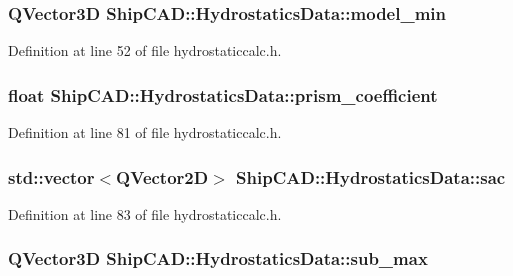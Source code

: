 \subsubsection[{\texorpdfstring{model\+\_\+min}{model_min}}]{\setlength{\rightskip}{0pt plus 5cm}Q\+Vector3D Ship\+C\+A\+D\+::\+Hydrostatics\+Data\+::model\+\_\+min}\hypertarget{structShipCAD_1_1HydrostaticsData_acd93669bc08fa097974d41fbaf4dc81f}{}\label{structShipCAD_1_1HydrostaticsData_acd93669bc08fa097974d41fbaf4dc81f}


Definition at line 52 of file hydrostaticcalc.\+h.

\subsubsection[{\texorpdfstring{prism\+\_\+coefficient}{prism_coefficient}}]{\setlength{\rightskip}{0pt plus 5cm}float Ship\+C\+A\+D\+::\+Hydrostatics\+Data\+::prism\+\_\+coefficient}\hypertarget{structShipCAD_1_1HydrostaticsData_acabee310fcde293fcb0d9a5fd5effe27}{}\label{structShipCAD_1_1HydrostaticsData_acabee310fcde293fcb0d9a5fd5effe27}


Definition at line 81 of file hydrostaticcalc.\+h.

\subsubsection[{\texorpdfstring{sac}{sac}}]{\setlength{\rightskip}{0pt plus 5cm}std\+::vector$<$Q\+Vector2D$>$ Ship\+C\+A\+D\+::\+Hydrostatics\+Data\+::sac}\hypertarget{structShipCAD_1_1HydrostaticsData_a503a1f2299db9d5ae923e598b8ee31ba}{}\label{structShipCAD_1_1HydrostaticsData_a503a1f2299db9d5ae923e598b8ee31ba}


Definition at line 83 of file hydrostaticcalc.\+h.

\subsubsection[{\texorpdfstring{sub\+\_\+max}{sub_max}}]{\setlength{\rightskip}{0pt plus 5cm}Q\+Vector3D Ship\+C\+A\+D\+::\+Hydrostatics\+Data\+::sub\+\_\+max}\hypertarget{structShipCAD_1_1HydrostaticsData_ab3a6e316a991426c74673025439f123c}{}\label{structShipCAD_1_1HydrostaticsData_ab3a6e316a991426c74673025439f123c}


